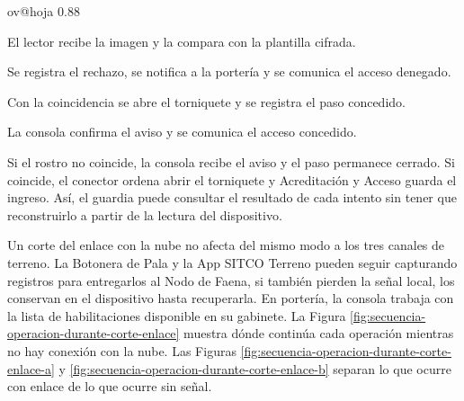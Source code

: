 \documentclass[subdoc]{../../comun/overfore}
\begin{document}
\begin{horizontal}
\csname ov@hoja\endcsname{330.2mm}{215.9mm}
\expandafter\def\csname ov@altofig\endcsname{0.88}

\clearpage
\addtocounter{figure}{-1}
\begingroup
\def\thefigure{4.21a}
\def\theHfigure{4.21a}
\endgroup
El lector recibe la imagen y la compara con la plantilla cifrada.

\clearpage
\addtocounter{figure}{-1}
\begingroup
\def\thefigure{4.21b}
\def\theHfigure{4.21b}
\endgroup
Se registra el rechazo, se notifica a la portería y se comunica el acceso denegado.

\clearpage
\addtocounter{figure}{-1}
\begingroup
\def\thefigure{4.21c}
\def\theHfigure{4.21c}
\endgroup
Con la coincidencia se abre el torniquete y se registra el paso concedido.

\clearpage
\addtocounter{figure}{-1}
\begingroup
\def\thefigure{4.21d}
\def\theHfigure{4.21d}
\endgroup
La consola confirma el aviso y se comunica el acceso concedido.
\end{horizontal}
Si el rostro no coincide, la consola recibe el aviso y el paso permanece cerrado. Si coincide, el conector ordena abrir el torniquete y Acreditación y Acceso guarda el ingreso. Así, el guardia puede consultar el resultado de cada intento sin tener que reconstruirlo a partir de la lectura del dispositivo.

Un corte del enlace con la nube no afecta del mismo modo a los tres canales de terreno. La Botonera de Pala y la App SITCO Terreno pueden seguir capturando registros para entregarlos al Nodo de Faena, si también pierden la señal local, los conservan en el dispositivo hasta recuperarla. En portería, la consola trabaja con la lista de habilitaciones disponible en su gabinete. La Figura \ref{fig:secuencia-operacion-durante-corte-enlace} muestra dónde continúa cada operación mientras no hay conexión con la nube. Las Figuras \ref{fig:secuencia-operacion-durante-corte-enlace-a} y \ref{fig:secuencia-operacion-durante-corte-enlace-b} separan lo que ocurre con enlace de lo que ocurre sin señal.
\end{document}
